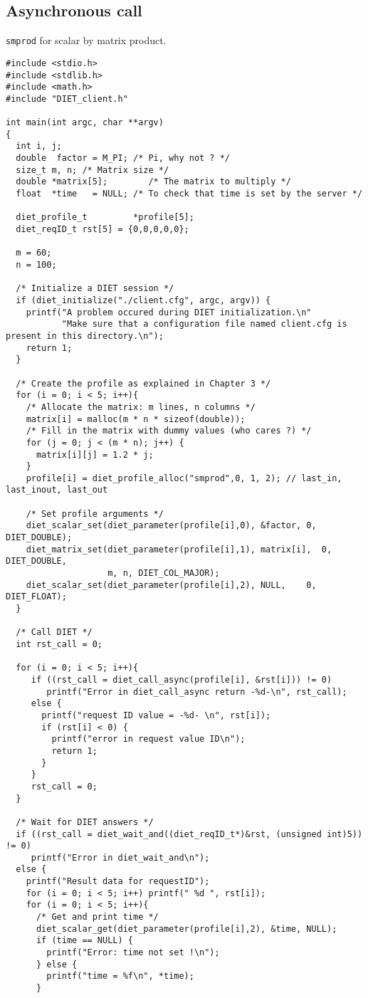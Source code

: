 \subsection{Asynchronous call}
\texttt{smprod}
for scalar by matrix product.
{\footnotesize
\begin{verbatim}
#include <stdio.h>
#include <stdlib.h>
#include <math.h>
#include "DIET_client.h"

int main(int argc, char **argv)
{
  int i, j;
  double  factor = M_PI; /* Pi, why not ? */
  size_t m, n; /* Matrix size */
  double *matrix[5];        /* The matrix to multiply */
  float  *time   = NULL; /* To check that time is set by the server */

  diet_profile_t         *profile[5];
  diet_reqID_t rst[5] = {0,0,0,0,0};

  m = 60;
  n = 100;
 
  /* Initialize a DIET session */
  if (diet_initialize("./client.cfg", argc, argv)) {
    printf("A problem occured during DIET initialization.\n"
           "Make sure that a configuration file named client.cfg is present in this directory.\n");
    return 1;
  }

  /* Create the profile as explained in Chapter 3 */
  for (i = 0; i < 5; i++){
    /* Allocate the matrix: m lines, n columns */
    matrix[i] = malloc(m * n * sizeof(double));
    /* Fill in the matrix with dummy values (who cares ?) */
    for (j = 0; j < (m * n); j++) {
      matrix[i][j] = 1.2 * j;
    }
    profile[i] = diet_profile_alloc("smprod",0, 1, 2); // last_in, last_inout, last_out
  
    /* Set profile arguments */
    diet_scalar_set(diet_parameter(profile[i],0), &factor, 0, DIET_DOUBLE);
    diet_matrix_set(diet_parameter(profile[i],1), matrix[i],  0, DIET_DOUBLE,
                    m, n, DIET_COL_MAJOR);
    diet_scalar_set(diet_parameter(profile[i],2), NULL,    0, DIET_FLOAT);
  }
  
  /* Call DIET */
  int rst_call = 0;
  
  for (i = 0; i < 5; i++){
     if ((rst_call = diet_call_async(profile[i], &rst[i])) != 0)  
        printf("Error in diet_call_async return -%d-\n", rst_call);
     else {
       printf("request ID value = -%d- \n", rst[i]);
       if (rst[i] < 0) {
         printf("error in request value ID\n");
         return 1;
       }
     }
     rst_call = 0;
  }   

  /* Wait for DIET answers */
  if ((rst_call = diet_wait_and((diet_reqID_t*)&rst, (unsigned int)5)) != 0)
     printf("Error in diet_wait_and\n");
  else {
    printf("Result data for requestID");
    for (i = 0; i < 5; i++) printf(" %d ", rst[i]);
    for (i = 0; i < 5; i++){
      /* Get and print time */
      diet_scalar_get(diet_parameter(profile[i],2), &time, NULL);
      if (time == NULL) {
        printf("Error: time not set !\n");
      } else {
        printf("time = %f\n", *time);
      }


\end{verbatim}}
